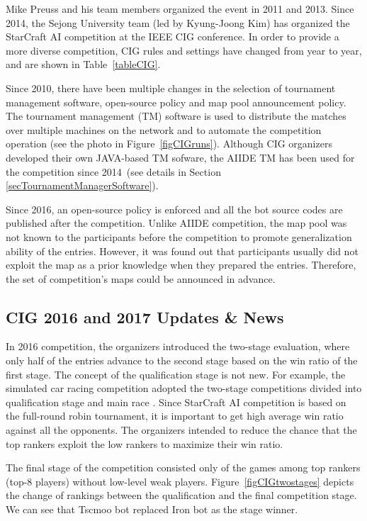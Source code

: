Mike Preuss and his team members organized the event in 2011 and 2013. Since 2014, the Sejong University team (led by Kyung-Joong Kim) has organized the StarCraft AI competition at the IEEE CIG conference. In order to provide a more diverse competition, CIG rules and settings have changed from year to year, and are shown in Table~\ref{tableCIG}. 

Since 2010, there have been multiple changes in the selection of tournament management software, open-source policy and map pool announcement policy. The tournament management (TM) software is used to distribute the matches over multiple machines on the network and to automate the competition operation (see the photo in Figure~\ref{figCIGruns}). Although CIG organizers developed their own JAVA-based TM sofware, the AIIDE TM has been used for the competition since 2014~(see details in Section \ref{secTournamentManagerSoftware}). 

Since 2016, an open-source policy is enforced and all the bot source codes are published after the competition. Unlike AIIDE competition, the map pool was not known to the participants before the competition to promote generalization ability of the entries. However, it was found out that participants usually did not exploit the map as a prior knowledge when they prepared the entries. Therefore, the set of competition's maps could be announced in advance. 

\subsection{CIG 2016 and 2017 Updates \& News}\label{subsecCIGnews}

In 2016 competition, the organizers introduced the two-stage evaluation, where only half of the entries advance to the second stage based on the win ratio of the first stage. The concept of the qualification stage is not new. For example, the simulated car racing competition adopted the two-stage competitions divided into qualification stage and main race \cite{loiacono20102009}. Since StarCraft AI competition is based on the full-round robin tournament, it is important to get high average win ratio against all the opponents. The organizers intended to reduce the chance that the top rankers exploit the low rankers to maximize their win ratio. 

The final stage of the competition consisted only of the games among top rankers (top-8 players) without low-level weak players. Figure~\ref{figCIGtwostages} depicts the change of rankings between the qualification and the final competition stage. We can see that Tscmoo bot replaced Iron bot as the stage winner. 

